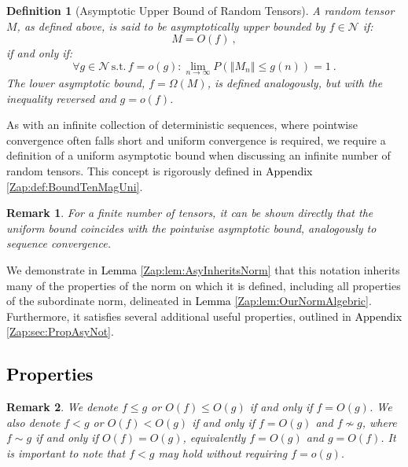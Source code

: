 \documentclass{article} %
\newtheorem{definition}{Definition}[section]
\newtheorem{remark}{Remark}
[section]
\begin{document}
\begin{definition}
[Asymptotic Upper Bound of Random Tensors]
\label{def:BoundTenMag}
\textup{A random tensor \(M\), as defined above, is said to be asymptotically upper bounded by \(f\in\mathcal{N}\) if:
\begin{equation}
M= O\left(f\right) \ ,
\end{equation}
if and only if:
\begin{equation}
\forall g\in\mathcal{N}\,\text{s.t.}\,f=o\left(g\right):\lim_{n\rightarrow\infty}P\left(\left\Vert M_n\right\Vert \leq g\left(n\right)\right)=1\ .
\label{eq:BoundTenMag1}
\end{equation}
The lower asymptotic bound, \(f=\Omega (M)\), is defined analogously, but with the inequality reversed and \(g=o(f)\).
}
\end{definition}

As with an infinite collection of deterministic sequences, where pointwise convergence often falls short and uniform convergence is required, we require a definition of a uniform asymptotic bound when discussing an infinite number of random tensors. This concept is rigorously defined in \textcolor{black}{Appendix \ref{Zap:def:BoundTenMagUni}}.

\begin{remark}
\textup
{For a finite number of tensors, it can be shown directly that the uniform bound coincides with the pointwise asymptotic bound, analogously to sequence convergence.}
\end{remark}

We demonstrate in \textcolor{black}{Lemma \ref{Zap:lem:AsyInheritsNorm}} that this notation inherits many of the properties of the norm on which it is defined, including all properties of the subordinate norm, delineated in \textcolor{black}{Lemma \ref{Zap:lem:OurNormAlgebric}}. Furthermore, it satisfies several additional useful properties, outlined in \textcolor{black}{Appendix \ref{Zap:sec:PropAsyNot}}.

\subsection{\textcolor{black}{Properties}}

\begin{remark}
\textup{
We denote \(f\leq g\) or \(O(f)\leq O(g)\) if and only if \(f=O(g)\). We also denote \(f<g\) or \(O(f)<O(g)\) if and only if \(f=O(g)\) and \(f\not\sim g\), where \(f\sim g\) if and only if \(O\left(f\right)=O\left(g\right)\), equivalently \(f=O\left(g\right)\) and \(g=O\left(f\right)\). It is important to note that \(f<g\) may hold without requiring \(f=o(g)\).
}
\end{remark}
\end{document}

